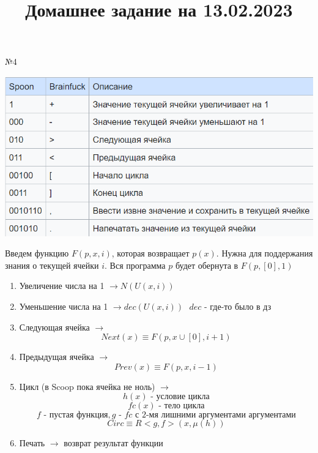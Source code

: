 \documentclass[14pt]{article}
\title{Домашнее задание на 13.02.2023}
\begin{document}
 \maketitle

\begin{center} №4 \end{center}

\begin{center}
    \includegraphics[scale=0.5]{scoop} \\
    
    \begin{center}
        Введем функцию $F(p, x, i)$, которая возвращает $p(x)$. \newline
        Нужна для поддержания знания о текущей ячейки $i$. \newline
        Вся программа $p$ будет обернута в $F(p, [0], 1)$ \newline
    \end{center}
    \begin{enumerate}
        \item Увеличение числа на 1 $\rightarrow N(U(x, i))$
        \item Уменьшение числа на 1 $\rightarrow dec(U(x, i)) \text{ $dec$ - где-то было в дз}$
        \item Следующая ячейка $\rightarrow$
            $$Next(x) \equiv F(p, x \cup [0], i + 1)$$
        \item Предыдущая ячейка $\rightarrow$
            $$Prev(x) \equiv F(p, x, i - 1)$$
        \item Цикл (в Scoop пока ячейка не ноль) $\rightarrow$
            $$h(x) \text{ - условие цикла}$$
            $$fc(x) \text{ - тело цикла}$$
            $$f \text{ - пустая функция}, g \text{ - $fc$ с 2-мя лишними аргументами аргументами} $$
            $$Circ \equiv R<g,f>(x, \mu(h))$$
        \item Печать $\rightarrow$ возврат результат функции
    \end{enumerate}
    
\end{center}
\end{document}
